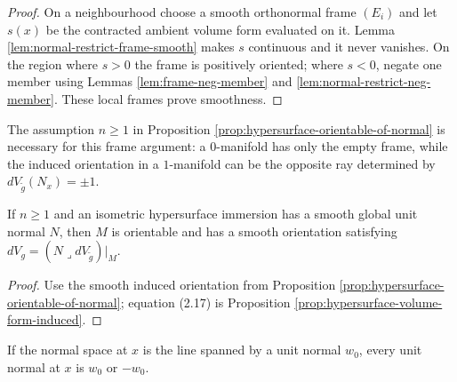 \begin{proof}
\leanok
{}
\sketch On a neighbourhood choose a smooth orthonormal frame $(E_i)$ and let $s(x)$ be the contracted ambient volume form evaluated on it. Lemma \ref{lem:normal-restrict-frame-smooth} makes $s$ continuous and it never vanishes. On the region where $s>0$ the frame is positively oriented; where $s<0$, negate one member using Lemmas \ref{lem:frame-neg-member} and \ref{lem:normal-restrict-neg-member}. These local frames prove smoothness.
\end{proof}

\begin{remark}
\label{rem:hypersurface-orientation-dimension}
The assumption $n\ge1$ in Proposition \ref{prop:hypersurface-orientable-of-normal} is necessary for this frame argument: a $0$-manifold has only the empty frame, while the induced orientation in a $1$-manifold can be the opposite ray determined by $dV_{\widetilde g}(N_x)=\pm1$.
\end{remark}

\begin{proposition}
\label{prop:hypersurface-volume-form-if}
\leanok
{}
If $n\ge1$ and an isometric hypersurface immersion has a smooth global unit normal $N$, then $M$ is orientable and has a smooth orientation satisfying $dV_g=(N\lrcorner dV_{\widetilde g})|_M$.
\end{proposition}

\begin{proof}
\leanok
{}
\sketch Use the smooth induced orientation from Proposition \ref{prop:hypersurface-orientable-of-normal}; equation (2.17) is Proposition \ref{prop:hypersurface-volume-form-induced}.
\end{proof}

\begin{lemma}
\label{lem:two-unit-normals}
\leanok
{}
If the normal space at $x$ is the line spanned by a unit normal $w_0$, every unit normal at $x$ is $w_0$ or $-w_0$.
\end{lemma}

